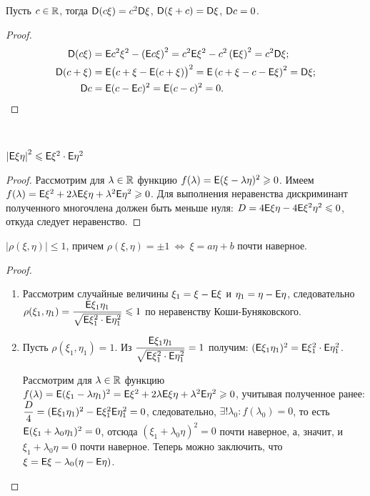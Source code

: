 \begin{property}
	Пусть $c \in \mathbb{R}$, тогда $\mathsf{D} (c \xi ) = c^2 \mathsf{D} \xi$, $\mathsf{D} (\xi + c ) =  \mathsf{D} \xi$, $\mathsf{D} c = 0$.
	\begin{proof}
		\vspace{-2pc}
		\begin{align*}
			\mathsf{D} (c \xi ) &= \mathsf{E} c^2 \xi^2 - \left( \mathsf{E} c \xi \right)^2 = c^2 \mathsf{E} \xi^2 - c^2 \left( \mathsf{E} \xi \right)^2 = c^2 \mathsf{D} \xi;\\
			\mathsf{D} ( c + \xi ) &= \mathsf{E} \big( c + \xi - \mathsf{E} ( c + \xi ) \big)^2 = \mathsf{E} \left( c + \xi - c - \mathsf{E} \xi  \right)^2 = \mathsf{D} \xi; \\
			\mathsf{D} c &= \mathsf{E} (c - \mathsf{E} c )^2 = \mathsf{E} (c - c)^2 = 0. \qedhere
		\end{align*} 
	\end{proof}
\end{property}

\begin{property}~

	$\left| \mathsf{E} \xi \eta \right|^2 \leqslant \mathsf{E} \xi^2 \cdot \mathsf{E} \eta^2$
	\begin{proof}
		Рассмотрим для $\lambda \in \mathbb{R}$ функцию $f( \lambda ) = \mathsf{E} (\xi - \lambda \eta)^2 \geqslant 0$. Имеем $f( \lambda ) = \mathsf{E} \xi^2 + 2 \lambda \mathsf{E} \xi \eta + \lambda^2 \mathsf{E} \eta^2 \geqslant 0$. Для выполнения неравенства дискриминант  полученного многочлена должен быть меньше нуля: $D = 4 \mathsf{E} \xi \eta - 4 \mathsf{E} \xi^2 \eta^2 \leqslant 0$, откуда следует неравенство.
	\end{proof}
\end{property}

\begin{property}
	$| \rho (\xi , \eta ) | \leqslant 1$, причем $\rho ( \xi , \eta ) = \pm 1 ~\Leftrightarrow~ \xi = a \eta + b$ почти наверное.
	\begin{proof}
	    \begin{enumerate}
    		\item Рассмотрим случайные величины $\xi_1 = \xi - \mathsf{E} \xi$ и $\eta_1 = \eta - \mathsf{E} \eta$, следовательно $\rho ( \xi_1 , \eta_1 ) = \dfrac{\mathsf{E} \xi_1 \eta_1}{\sqrt{\mathsf{E} \xi_1^2 \cdot \mathsf{E} \eta_1^2}} \leqslant 1$ по неравенству Коши-Буняковского. 
    		
    		\item Пусть $\rho (\xi_1, \eta_1) = 1$. Из $\dfrac{\mathsf{E} \xi_1 \eta_1}{\sqrt{\mathsf{E} \xi_1^2 \cdot \mathsf{E} \eta_1^2}} = 1$ получим: $(\mathsf{E} \xi_1 \eta_1)^2 = \mathsf{E} \xi_1^2 \cdot \mathsf{E} \eta_1^2$.
    		
    		Рассмотрим для $\lambda \in \mathbb{R}$ функцию $f( \lambda ) = \mathsf{E} (\xi_1 - \lambda \eta_1)^2 = \mathsf{E} \xi^2 + 2 \lambda \mathsf{E} \xi \eta + \lambda^2 \mathsf{E} \eta^2 \geqslant 0$, учитывая полученное ранее: $\dfrac{D}{4} = (\mathsf{E}\xi_1\eta_1)^2 - \mathsf{E}\xi_1^2\mathsf{E}\eta_1^2 = 0$, следовательно, $\exists !\lambda_0: f(\lambda_0) = 0$,  то есть $\mathsf{E} ( \xi_1 + \lambda_0 \eta_1 )^2 = 0$, отсюда $(\xi_1 + \lambda_0 \eta )^2 = 0$ почти наверное, а, значит, и $\xi_1 + \lambda_0 \eta  = 0$ почти наверное. Теперь можно заключить, что $\xi = \mathsf{E} \xi - \lambda_0 (\eta - \mathsf{E} \eta )$.
		\end{enumerate}
	\end{proof}
\end{property}

